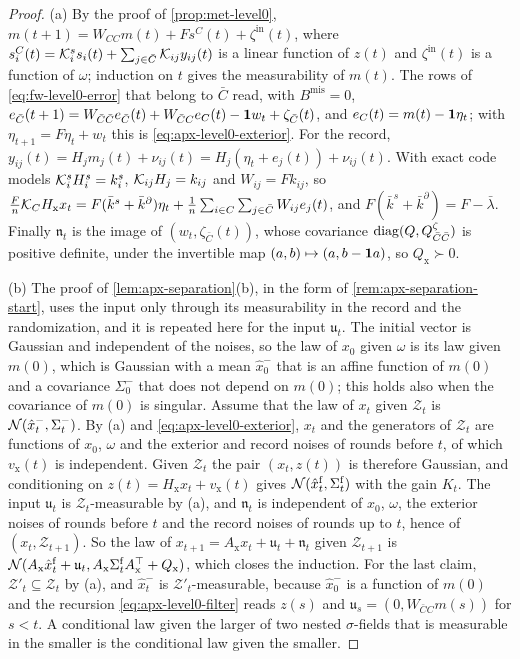 \begin{proof}
(a) By the proof of \cref{prop:met-level0}, $m(t+1)=W_{CC}m(t)+Fs^C(t)+\zeta^{\mathrm{in}}(t)$, where $s^C_i(t)=\mathcal{K}^s_is_i(t)+\sum_{j\in\bar C}\mathcal{K}_{ij}y_{ij}(t)$ is a linear function of $z(t)$ and $\zeta^{\mathrm{in}}(t)$ is a function of $\omega$; induction on $t$ gives the measurability of $m(t)$. The rows of \eqref{eq:fw-level0-error} that belong to $\bar C$ read, with $B^{\mathrm{mis}}=0$, $e_{\bar C}(t+1)=W_{\bar C\bar C}e_{\bar C}(t)+W_{\bar CC}e_C(t)-\mathbf{1} w_t+\zeta_{\bar C}(t)$, and $e_C(t)=m(t)-\mathbf{1}\eta_t$; with $\eta_{t+1}=F\eta_t+w_t$ this is \eqref{eq:apx-level0-exterior}. For the record, $y_{ij}(t)=H_jm_j(t)+\nu_{ij}(t)=H_j(\eta_t+e_j(t))+\nu_{ij}(t)$. With exact code models $\mathcal{K}^s_iH^s_i=k^s_i$, $\mathcal{K}_{ij}H_j=k_{ij}$ and $W_{ij}=Fk_{ij}$, so $\frac Fn\mathcal{K}_CH_{\mathrm x}x_t=F(\bar k^s+\bar k^\partial)\eta_t+\frac1n\sum_{i\in C}\sum_{j\in\bar C}W_{ij}e_j(t)$, and $F(\bar k^s+\bar k^\partial)=F-\bar\lambda$. Finally $\mathfrak n_t$ is the image of $(w_t,\zeta_{\bar C}(t))$, whose covariance $\operatorname{diag}(Q,Q^\zeta_{\bar C\bar C})$ is positive definite, under the invertible map $(a,b)\mapsto(a,b-\mathbf{1} a)$, so $Q_{\mathrm x}\succ0$.

(b) The proof of \cref{lem:apx-separation}(b), in the form of \cref{rem:apx-separation-start}, uses the input only through its measurability in the record and the randomization, and it is repeated here for the input $\mathfrak u_t$. The initial vector is Gaussian and independent of the noises, so the law of $x_0$ given $\omega$ is its law given $m(0)$, which is Gaussian with a mean $\hat x^-_0$ that is an affine function of $m(0)$ and a covariance $\Sigma^-_0$ that does not depend on $m(0)$; this holds also when the covariance of $m(0)$ is singular. Assume that the law of $x_t$ given $\mathcal Z_t$ is $\mathcal{N}(\hat x^-_t,\Sigma^-_t)$. By (a) and \eqref{eq:apx-level0-exterior}, $x_t$ and the generators of $\mathcal Z_t$ are functions of $x_0$, $\omega$ and the exterior and record noises of rounds before $t$, of which $v_{\mathrm x}(t)$ is independent. Given $\mathcal Z_t$ the pair $(x_t,z(t))$ is therefore Gaussian, and conditioning on $z(t)=H_{\mathrm x}x_t+v_{\mathrm x}(t)$ gives $\mathcal{N}(\hat x^{\mathrm f}_t,\Sigma^{\mathrm f}_t)$ with the gain $K_t$. The input $\mathfrak u_t$ is $\mathcal Z_t$-measurable by (a), and $\mathfrak n_t$ is independent of $x_0$, $\omega$, the exterior noises of rounds before $t$ and the record noises of rounds up to $t$, hence of $(x_t,\mathcal Z_{t+1})$. So the law of $x_{t+1}=A_{\mathrm x}x_t+\mathfrak u_t+\mathfrak n_t$ given $\mathcal Z_{t+1}$ is $\mathcal{N}(A_{\mathrm x}\hat x^{\mathrm f}_t+\mathfrak u_t,A_{\mathrm x}\Sigma^{\mathrm f}_tA_{\mathrm x}^\top+Q_{\mathrm x})$, which closes the induction. For the last claim, $\mathcal Z'_t\subseteq\mathcal Z_t$ by (a), and $\hat x^-_t$ is $\mathcal Z'_t$-measurable, because $\hat x^-_0$ is a function of $m(0)$ and the recursion \eqref{eq:apx-level0-filter} reads $z(s)$ and $\mathfrak u_s=(0,W_{\bar CC}m(s))$ for $s<t$. A conditional law given the larger of two nested $\sigma$-fields that is measurable in the smaller is the conditional law given the smaller.


\end{proof}
